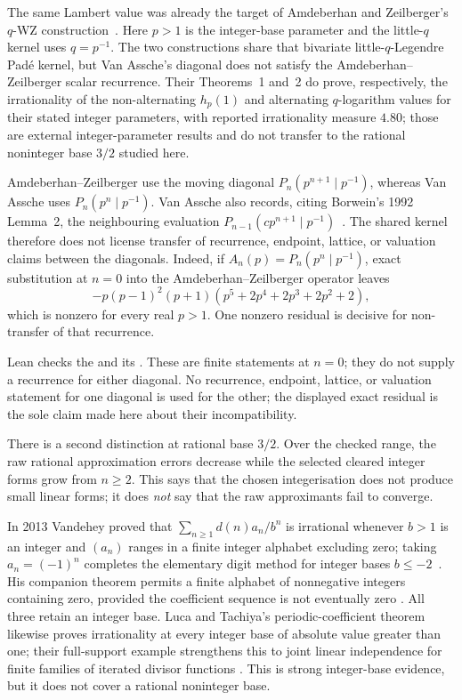 \documentclass[11pt]{article}
\begin{document}
The same Lambert value was already the target of Amdeberhan and
Zeilberger's $q$-WZ construction~\cite{az1998}.  Here $p>1$ is the integer-base
parameter and the little-$q$ kernel uses $q=p^{-1}$.  The two constructions
share that bivariate little-$q$-Legendre Pad\'e kernel, but Van Assche's
diagonal does not satisfy the Amdeberhan--Zeilberger scalar recurrence.
Their Theorems~1 and~2 do prove, respectively, the irrationality of the
non-alternating $h_p(1)$ and alternating $q$-logarithm values for their stated
integer parameters, with reported irrationality measure $4.80$; those are
external integer-parameter results and do not transfer to the rational
noninteger base $3/2$ studied here.

Amdeberhan--Zeilberger use the moving diagonal
$P_n(p^{n+1}\mid p^{-1})$, whereas Van Assche uses
$P_n(p^n\mid p^{-1})$.  Van Assche also records, citing
Borwein's 1992 Lemma~2, the neighbouring evaluation
$P_{n-1}(c p^{n+1}\mid p^{-1})$~\cite{borwein1992,vanassche2001}.
The shared kernel therefore does not license transfer of recurrence,
endpoint, lattice, or valuation claims between the diagonals.  Indeed, if
$A_n(p)=P_n(p^n\mid p^{-1})$, exact substitution at $n=0$ into the
Amdeberhan--Zeilberger operator leaves
\[
 -p(p-1)^2(p+1)(p^5+2p^4+2p^3+2p^2+2),
\]
which is nonzero for every real $p>1$.  One nonzero residual is decisive for
non-transfer of that recurrence.

Lean checks the
 and its
.  These are finite statements at $n=0$; they do not supply a
recurrence for either diagonal.  No recurrence, endpoint, lattice, or
valuation statement for one diagonal is used for the other; the displayed
exact residual is the sole claim made here about their incompatibility.

There is a second distinction at rational base $3/2$.  Over the checked range,
the raw rational approximation errors decrease while the selected cleared
integer forms grow from $n\ge2$.  This says that the chosen integerisation does
not produce small linear forms; it does \emph{not} say that the raw approximants
fail to converge.

In 2013 Vandehey proved that
$\sum_{n\ge1}d(n)a_n/b^n$ is irrational whenever $b>1$ is an integer and
$(a_n)$ ranges in a finite integer alphabet excluding zero; taking
$a_n=(-1)^n$ completes the elementary digit method for integer bases
$b\le-2$~\cite[Thm.~1.2, p.~2]{vandehey2013}.  His companion theorem permits
a finite alphabet of nonnegative integers containing zero, provided the
coefficient sequence is not eventually zero
\cite[Thm.~1.1, p.~2]{vandehey2013}.  All
three retain an integer base.  Luca and Tachiya's periodic-coefficient theorem
likewise proves irrationality at every integer base of absolute value greater
than one; their full-support example strengthens this to joint linear
independence for finite families of iterated divisor functions
\cite[Theorem~A, p.~139; Example~1, p.~140]{lucatachiya2017}.  This is strong
integer-base evidence, but it does not cover a rational noninteger base.
\end{document}
